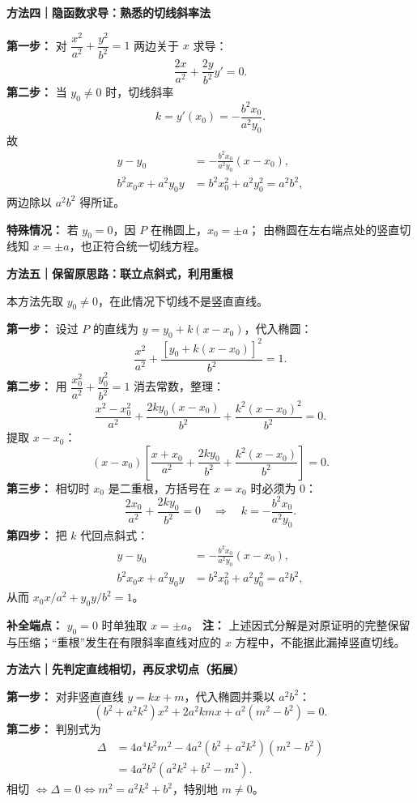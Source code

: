 \begin{proofbox}
\medskip
\textbf{\textcolor{CProof}{方法四｜隐函数求导：熟悉的切线斜率法}}

\textbf{第一步：} 对 $\dfrac{x^2}{a^2}+\dfrac{y^2}{b^2}=1$ 两边关于 $x$ 求导：
\[
 \frac{2x}{a^2}+\frac{2y}{b^2}y'=0.
\]
\textbf{第二步：} 当 $y_0\ne0$ 时，切线斜率
\[
 k=y'(x_0)=-\frac{b^2x_0}{a^2y_0}.
\]
故
\[
\begin{aligned}
 y-y_0&=-\frac{b^2x_0}{a^2y_0}(x-x_0),\\
 b^2x_0x+a^2y_0y&=b^2x_0^2+a^2y_0^2=a^2b^2,
\end{aligned}
\]
两边除以 $a^2b^2$ 得所证。

\textbf{特殊情况：} 若 $y_0=0$，因 $P$ 在椭圆上，$x_0=\pm a$；
由椭圆在左右端点处的竖直切线知 $x=\pm a$，也正符合统一切线方程。

\medskip
\textbf{\textcolor{CProof}{方法五｜保留原思路：联立点斜式，利用重根}}

本方法先取 $y_0\ne0$，在此情况下切线不是竖直直线。

\textbf{第一步：} 设过 $P$ 的直线为 $y=y_0+k(x-x_0)$，代入椭圆：
\[
 \frac{x^2}{a^2}+\frac{[y_0+k(x-x_0)]^2}{b^2}=1.
\]
\textbf{第二步：} 用 $\dfrac{x_0^2}{a^2}+\dfrac{y_0^2}{b^2}=1$ 消去常数，整理：
\[
 \frac{x^2-x_0^2}{a^2}
 +\frac{2ky_0(x-x_0)}{b^2}
 +\frac{k^2(x-x_0)^2}{b^2}=0.
\]
提取 $x-x_0$：
\[
 (x-x_0)\left[
 \frac{x+x_0}{a^2}+\frac{2ky_0}{b^2}
 +\frac{k^2(x-x_0)}{b^2}\right]=0.
\]
\textbf{第三步：} 相切时 $x_0$ 是二重根，方括号在 $x=x_0$ 时必须为 $0$：
\[
 \frac{2x_0}{a^2}+\frac{2ky_0}{b^2}=0
 \quad\Longrightarrow\quad k=-\frac{b^2x_0}{a^2y_0}.
\]
\textbf{第四步：} 把 $k$ 代回点斜式：
\[
\begin{aligned}
 y-y_0&=-\frac{b^2x_0}{a^2y_0}(x-x_0),\\
 b^2x_0x+a^2y_0y
 &=b^2x_0^2+a^2y_0^2=a^2b^2,
\end{aligned}
\]
从而 $x_0x/a^2+y_0y/b^2=1$。

\textbf{补全端点：} $y_0=0$ 时单独取 $x=\pm a$。
\textbf{注：} 上述因式分解是对原证明的完整保留与压缩；“重根”发生在有限斜率直线对应的 $x$ 方程中，不能据此漏掉竖直切线。

\medskip
\textbf{\textcolor{CProof}{方法六｜先判定直线相切，再反求切点（拓展）}}

\textbf{第一步：} 对非竖直直线 $y=kx+m$，代入椭圆并乘以 $a^2b^2$：
\[
 (b^2+a^2k^2)x^2+2a^2kmx+a^2(m^2-b^2)=0.
\]
\textbf{第二步：} 判别式为
\[
\begin{aligned}
 \Delta
 &=4a^4k^2m^2-4a^2(b^2+a^2k^2)(m^2-b^2)\\
 &=4a^2b^2(a^2k^2+b^2-m^2).
\end{aligned}
\]
相切 $\iff\Delta=0\iff\boxed{m^2=a^2k^2+b^2}$，特别地 $m\ne0$。


\end{proofbox}
